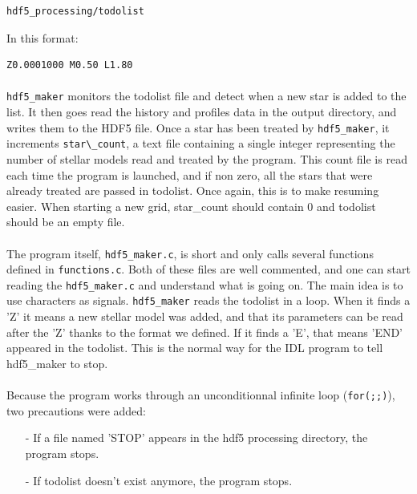 \documentclass{report}
\begin{document}
\begin{verbatim}
hdf5_processing/todolist
\end{verbatim}

In this format:

\begin{verbatim}
Z0.0001000 M0.50 L1.80
\end{verbatim}

\paragraph{}\verb+hdf5_maker+ monitors the todolist file and detect when a new star is added to the list. It then goes read the history and profiles data in the output directory, and writes them to the HDF5 file. Once a star has been treated by \verb+hdf5_maker+, it increments \verb+star\_count+, a text file containing a single integer representing the number of stellar models read and treated by the program. This count file is read each time the program is launched, and if non zero, all the stars that were already treated are passed in todolist. Once again, this is to make resuming easier. When starting a new grid, star\_count should contain 0 and todolist should be an empty file.

\paragraph{}The program itself, \verb+hdf5_maker.c+, is short and only calls several functions defined in \verb+functions.c+. Both of these files are well commented, and one can start reading the \verb+hdf5_maker.c+ and understand what is going on. The main idea is to use characters as signals. \verb+hdf5_maker+ reads the todolist in a loop. When it finds a 'Z' it means a new stellar model was added, and that its parameters can be read after the 'Z' thanks to the format we defined. If it finds a 'E', that means 'END' appeared in the todolist. This is the normal way for the IDL program to tell hdf5\_maker to stop.

\paragraph{}Because the program works through an unconditionnal infinite loop (\verb+for(;;)+), two precautions were added:
\begin{itemize}
\item[-] If a file named 'STOP' appears in the hdf5 processing directory, the program stops.
\item[-] If todolist doesn't exist anymore, the program stops.
\end{itemize}
\end{document}
